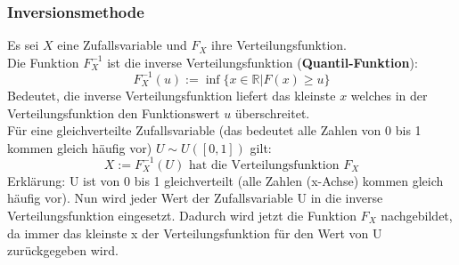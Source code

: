 \documentclass[12pt]{article}
\begin{document}
\subsubsection{Inversionsmethode}
Es sei $X$ eine Zufallsvariable und $F_X$ ihre Verteilungsfunktion.\\
Die Funktion $F_X^{-1}$ ist die inverse Verteilungsfunktion (\textbf{Quantil-Funktion}):
\begin{equation*}
	F_X^{-1}(u):= \inf\{x\in\mathbb{R}|F(x)\geq u\}
\end{equation*}
Bedeutet, die inverse Verteilungsfunktion liefert das kleinste $x$ welches in der Verteilungsfunktion den Funktionswert $u$ überschreitet.\\
Für eine gleichverteilte Zufallsvariable (das bedeutet alle Zahlen von 0 bis 1 kommen gleich häufig vor) $U\sim U([0,1])$ gilt:
\begin{equation*}
	X:=F_X^{-1}(U) \text{ hat die Verteilungsfunktion } F_X
\end{equation*}
Erklärung: U ist von 0 bis 1 gleichverteilt (alle Zahlen (x-Achse) kommen gleich häufig vor). Nun wird jeder Wert der Zufallsvariable U in die inverse Verteilungsfunktion eingesetzt. Dadurch wird jetzt die Funktion $F_X$ nachgebildet, da immer das kleinste x der Verteilungsfunktion für den Wert von U zurückgegeben wird.
\newpage
\end{document}
